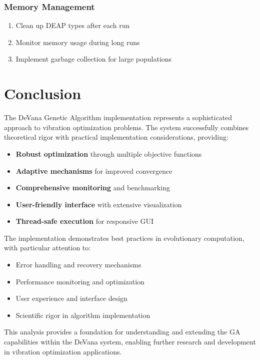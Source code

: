 \documentclass[12pt,a4paper]{article}
\begin{document}
\subsubsection{Memory Management}
\begin{enumerate}
    \item Clean up DEAP types after each run
    \item Monitor memory usage during long runs
    \item Implement garbage collection for large populations
\end{enumerate}

\section{Conclusion}

The DeVana Genetic Algorithm implementation represents a sophisticated approach to vibration optimization problems. The system successfully combines theoretical rigor with practical implementation considerations, providing:

\begin{itemize}
    \item \textbf{Robust optimization} through multiple objective functions
    \item \textbf{Adaptive mechanisms} for improved convergence
    \item \textbf{Comprehensive monitoring} and benchmarking
    \item \textbf{User-friendly interface} with extensive visualization
    \item \textbf{Thread-safe execution} for responsive GUI
\end{itemize}

The implementation demonstrates best practices in evolutionary computation, with particular attention to:
\begin{itemize}
    \item Error handling and recovery mechanisms
    \item Performance monitoring and optimization
    \item User experience and interface design
    \item Scientific rigor in algorithm implementation
\end{itemize}

This analysis provides a foundation for understanding and extending the GA capabilities within the DeVana system, enabling further research and development in vibration optimization applications.
\end{document}
